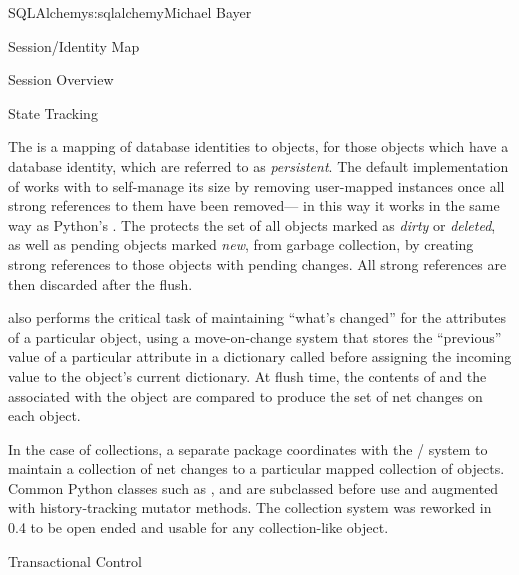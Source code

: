 \begin{aosachapter}{SQLAlchemy}{s:sqlalchemy}{Michael Bayer}
\begin{aosasect1}{Session/Identity Map}
\begin{aosasect2}{Session Overview}
\end{aosasect2}

\begin{aosasect2}{State Tracking}

The  is a mapping of database identities to  objects,
for those objects which have a database identity, which are referred to as \emph{persistent}.
The default implementation of  works with  to self-manage
its size by removing user-mapped instances once all strong references to them have been removed---
in this way it works in the same way as Python's .  The 
protects the set of all objects marked as \emph{dirty} or \emph{deleted}, as well as pending objects
marked \emph{new}, from garbage collection, by creating strong
references to those objects with pending changes.  All strong references are then discarded after the flush.

 also performs the critical task of maintaining ``what's changed''
for the attributes of a particular object, using a move-on-change system that
stores the ``previous'' value of a particular attribute in a dictionary
called  before assigning the incoming value to the
object's current dictionary.   At flush time, the contents of 
and the  associated with the object are compared to produce
the set of net changes on each object.

In the case of collections, a separate  package coordinates
with the /
system to maintain a collection of net changes to a particular mapped collection of
objects.   Common Python classes such as ,  and  are subclassed
before use and augmented with history-tracking mutator methods.   The collection system
was reworked in 0.4 to be open ended and usable for any collection-like object.

\end{aosasect2}

\begin{aosasect2}{Transactional Control}


\end{aosasect2}
\end{aosasect1}
\end{aosachapter}
